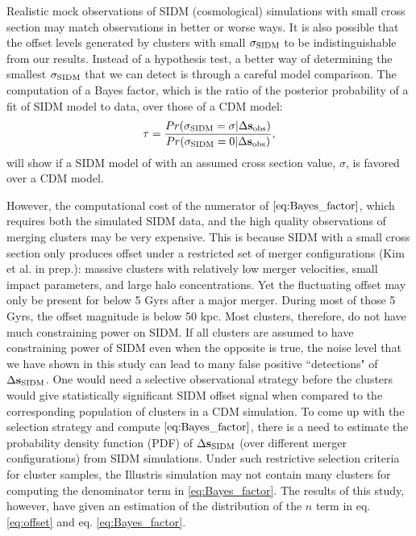 Realistic mock observations of SIDM (cosmological) simulations 
with small cross section may match observations in better or worse ways. 
It is also possible that the offset levels generated by clusters with small
$\sigma_{\rm SIDM}$ to be indistinguishable from our results. 
Instead of a hypothesis test, a better way of determining the smallest $\sigma_{{\rm SIDM}}$ that we can
detect is through a careful model comparison. The computation of a Bayes factor,
which is the ratio of the posterior probability of a fit of SIDM model to data,
over those of a CDM model:
\begin{equation}
	\tau = \frac{Pr(\sigma_{{\rm SIDM}} = \sigma | \Delta {\bf s}_{\rm
	obs})}{Pr(\sigma_{{\rm SIDM}} = 0 | \Delta {\bf s}_{\rm obs})},
	\label{eq:Bayes_factor}
\end{equation}
will show if a SIDM model of with an assumed cross section value, $\sigma$,
is favored over a CDM model.

However, the computational cost of the numerator of $\ref{eq:Bayes_factor}$, 
which requires both the simulated SIDM data, 
and the high quality observations of merging clusters
may be very expensive. 
This is because SIDM with a small cross section only produces offset 
under a restricted set of merger configurations (Kim et al. in prep.): 
massive clusters with relatively low merger velocities, small impact
parameters, and large halo concentrations. Yet the fluctuating offset may only
be present for below 5 Gyrs after a major merger. During most of those 5 Gyrs, 
the offset magnitude is below 50 kpc. 
Most clusters, therefore, do not have much constraining power on SIDM.
If all clusters are assumed to have constraining power of SIDM even when the
opposite is true, the noise level that we have shown in this study 
can lead to many false positive ``detections" of $\Delta {\bf s}_{{\rm SIDM}}$. 
One would need a selective observational strategy
before the clusters would give statistically significant SIDM offset signal when compared 
to the corresponding population of clusters in a CDM simulation. 
To come up with the selection strategy and compute $\ref{eq:Bayes_factor}$,
there is a need to estimate the probability density function (PDF) of
$\Delta {\bf s}_{{\rm SIDM}}$ (over different merger configurations) from SIDM simulations. 
Under such restrictive selection criteria for cluster samples, 
the Illustris simulation may not contain 
many clusters for computing the denominator term in \ref{eq:Bayes_factor}. 
The results of this study, however,
have given an estimation of the distribution of the $n$ term in
eq. \ref{eq:offset} and eq. \ref{eq:Bayes_factor}.  


